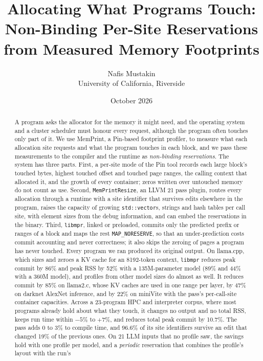 \documentclass[11pt]{article}
\title{Allocating What Programs Touch:\\
Non-Binding Per-Site Reservations from Measured Memory Footprints}
\author{Nafis Mustakin\\University of California, Riverside}
\date{October 2026}
\newcommand{\memprint}{MemPrint}
\newcommand{\libmpr}{\texttt{libmpr}}
\newcommand{\pass}{\texttt{MemPrintResize}}
\newcommand{\term}[1]{\emph{#1}}
\begin{document}
\setlength{\emergencystretch}{3em}
\maketitle

\begin{abstract}
A program asks the allocator for the memory it might need, and the operating system and a cluster scheduler
must honour every request, although the program often touches only part of it. We use \memprint{}, a Pin-based
footprint profiler, to measure what each allocation site requests and what the program touches in each block,
and we pass these measurements to the compiler and the runtime as \term{non-binding reservations}. The system has
three parts. First, a per-site mode of the Pin tool records each large block's touched bytes, highest touched
offset and touched page ranges, the calling context that allocated it, and the growth of every container; zeros
written over untouched memory do not count as use. Second, \pass{}, an LLVM 21 pass plugin, routes every allocation
through a runtime with a site identifier that survives edits elsewhere in the program, raises the capacity of
growing \texttt{std::vector}s, strings and hash tables per call site, with element sizes from the debug information,
and can embed the reservations in the binary. Third, \libmpr{}, linked or preloaded, commits only the predicted
prefix or ranges of a block and maps the rest \texttt{MAP\_NORESERVE}, so that an under-prediction costs commit
accounting and never correctness; it also skips the zeroing of pages a program has never touched. Every program
we ran produced its original output. On llama.cpp, which sizes and zeroes a KV cache for an 8192-token context,
\libmpr{} reduces peak commit by 86\% and peak RSS by 52\% with a 135M-parameter model (89\% and 44\% with a 360M
model), and profiles from other model sizes do almost as well. It reduces commit by 85\% on llama2.c, whose KV caches
are used in one range per layer, by 47\% on darknet AlexNet inference, and by 22\% on miniVite with the pass's
per-call-site container capacities. Across a 23-program HPC and interpreter corpus, where most programs already
hold about what they touch, it changes no output and no total RSS, keeps run time within $-5\%$ to $+7\%$, and
reduces total peak commit by 10.7\%. The pass adds 0 to 3\% to compile time, and 96.6\% of its site identifiers
survive an edit that changed 19\% of the previous ones. On 21 LLM inputs that no profile saw, the savings hold
with one profile per model, and a \term{periodic} reservation that combines the profile's layout with the run's

\end{abstract}
\end{document}
